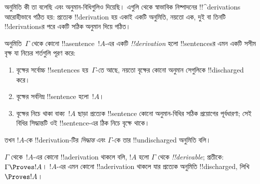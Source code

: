 \documentclass[../../../include/open-logic-section]{subfiles}
\begin{document}
      {}
      {}


\begin{explain}
অনুমিতি কী তা বলেছি এবং অনুমান-বিধিগুলিও দিয়েছি। এগুলি থেকে
স্বাভাবিক নিষ্পাদনের !!^{derivation}s আরোহীভাবে গঠিত হয়: প্রত্যেক
!!{derivation} হয় একাই একটি অনুমিতি, নয়তো এক, দুই বা তিনটি
!!{derivation}sর পরে একটি সঠিক অনুমান দিয়ে গঠিত।
\end{explain}

\begin{defn}[!!^{derivation}]
অনুমিতি~$\Gamma$ থেকে কোনো !!a{sentence}~$!A$-এর একটি
\emph{!!{derivation}} হলো !!{sentence}sর এমন একটি সসীম বৃক্ষ যা
নিচের শর্তগুলি পূরণ করে:
\begin{enumerate}
\item বৃক্ষের সর্বোচ্চ !!{sentence}s হয়~$\Gamma$-তে আছে, নয়তো
  বৃক্ষের কোনো অনুমান সেগুলিকে !!{discharged} করে।
\item বৃক্ষের সর্বনিম্ন !!{sentence} হলো~$!A$।
\item বৃক্ষের নিচে থাকা বাক্য~$!A$ ছাড়া প্রত্যেক !!{sentence} কোনো
  অনুমান-বিধির সঠিক প্রয়োগের পূর্বধারণা; সেই বিধির সিদ্ধান্তটি ওই
  !!{sentence}-এর ঠিক নিচে বৃক্ষে থাকে।
\end{enumerate}
তখন $!A$-কে !!{derivation}-টির \emph{সিদ্ধান্ত} এবং $\Gamma$-কে তার
!!{undischarged} অনুমিতি বলি।

$\Gamma$ থেকে~$!A$-এর কোনো !!a{derivation} থাকলে বলি, $!A$ হলো
$\Gamma$ থেকে \emph{!!{derivable}}; প্রতীকে: $\Gamma \Proves
!A$। $!A$-এর এমন কোনো !!a{derivation} থাকলে যার প্রত্যেক অনুমিতি
!!{discharged}, লিখি~$\Proves !A$।
\end{defn}
\end{document}
